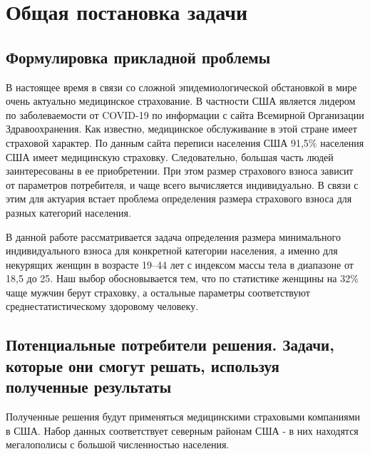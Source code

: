 \documentclass[a4paper,12pt]{article}
\begin{document}

%
\tableofcontents
\pagebreak

\section{Общая постановка задачи}
\subsection{Формулировка прикладной проблемы}
В настоящее время в связи со сложной эпидемиологической обстановкой в мире очень актуально медицинское страхование. В частности США является лидером по заболеваемости от COVID-19 по информации с сайта Всемирной Организации Здравоохранения. Как известно, медицинское обслуживание в этой стране имеет страховой характер. По данным сайта переписи населения США 91,5\% населения США имеет медицинскую страховку. Следовательно, большая часть людей заинтересованы в ее приобретении. При этом размер страхового взноса зависит от параметров потребителя, и чаще всего вычисляется индивидуально. В связи с этим для актуария встает проблема определения размера страхового взноса для разных категорий населения.

В данной работе рассматривается задача определения размера минимального индивидуального взноса для конкретной категории населения, а именно
для некурящих женщин в возрасте 19–44 лет с индексом массы тела в диапазоне от 18,5 до 25. Наш выбор обосновывается тем, что по статистике женщины на 32\% чаще мужчин берут страховку, а остальные параметры соответствуют среднестатистическому здоровому человеку.

\subsection{Потенциальные потребители решения. Задачи, которые они смогут решать,	используя полученные результаты}
Полученные решения будут применяться медицинскими страховыми компаниями в США. Набор данных соответствует северным районам США - в них находятся мегалополисы с большой численностью населения.
\end{document}
